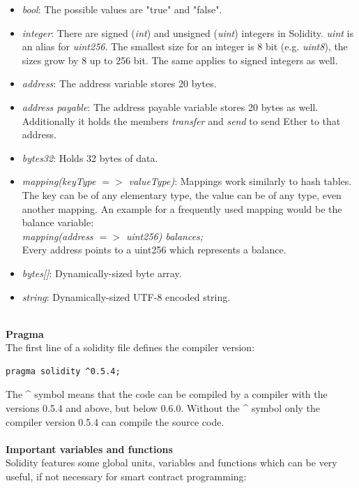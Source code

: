 \begin{itemize}
  \item \textit{bool}: The possible values are "true" and "false".
  \item \textit{integer}: There are signed (\textit{int}) and unsigned (\textit{uint}) integers in Solidity. \textit{uint} is an alias for \textit{uint256}. The smallest size for an integer is 8 bit (e.g. \textit{uint8}), the sizes grow by 8 up to 256 bit. The same applies to signed integers as well.
  \item \textit{address}: The address variable stores 20 bytes.
  \item \textit{address payable}: The address payable variable stores 20 bytes as well. Additionally it holds the members \textit{transfer} and \textit{send} to send Ether to that address.
  \item \textit{bytes32}: Holds 32 bytes of data.
  \item \textit{mapping(keyType $=>$ valueType)}: Mappings work similarly to hash tables. The key can be of any elementary type, the value can be of any type, even another mapping. An example for a frequently used mapping would be the balance variable:
  \\
  \textit{mapping(address $=>$ uint256) balances;}
  \\
  Every address points to a uint256 which represents a balance.
  \item \textit{bytes[]}: Dynamically-sized byte array.
  \item \textit{string}: Dynamically-sized UTF-8 encoded string.
\end{itemize}
\leavevmode
\\
\textbf{Pragma}\\
The first line of a solidity file defines the compiler version\cite{doc-pragma}:
\begin{lstlisting}[language=Solidity, numbers=none]
  pragma solidity ^0.5.4;
\end{lstlisting}
The \^{} symbol means that the code can be compiled by a compiler with the versions 0.5.4 and above, but below 0.6.0. Without the \^{} symbol only the compiler version 0.5.4 can compile the source code.
\\\\
\textbf{Important variables and functions}\\
Solidity features some global units, variables and functions which can be very useful, if not necessary for smart contract programming:
